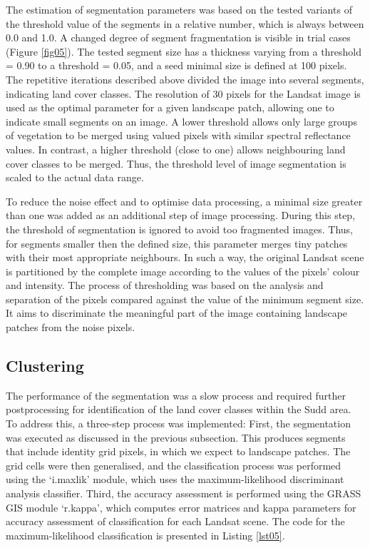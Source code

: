 \documentclass[analytics,article,accept,pdftex,moreauthors]{Definitions/mdpi}
\begin{document}
The estimation of segmentation parameters was based on the tested variants of the threshold value of the segments in a relative number, which is always between 0.0 and 1.0. A changed degree of segment fragmentation is visible in trial cases (Figure \ref{fig05}). The tested segment size has a thickness varying from a threshold = 0.90 to a threshold = 0.05, and a seed minimal size is defined at 100 pixels. %
The repetitive iterations described above divided the image into several segments, indicating land cover classes. The resolution of 30 pixels for the Landsat image is used as the optimal parameter for a given landscape patch, allowing one to indicate small segments on an image. A lower threshold allows only large groups of vegetation to be merged using valued pixels with similar spectral reflectance values. In contrast, a higher threshold (close to one) allows neighbouring land cover classes to be merged. Thus, the threshold level of image segmentation is scaled to the actual data range.

To reduce the noise effect and to optimise data processing, a minimal size greater than one was added as an additional step of image processing. During this step, the threshold of segmentation is ignored to avoid too fragmented images. Thus, for segments smaller then the defined size, this parameter merges tiny patches with their most appropriate neighbours. In such a way, the original Landsat scene is partitioned by the complete image according to the values of the pixels' colour and intensity. %
The process of thresholding was based on the analysis and separation of the pixels compared against the value of the minimum segment size. It aims to discriminate the meaningful part of the image containing landscape patches from the noise pixels.

\subsection{Clustering}

The performance of the segmentation was a slow process and required further postprocessing for identification of the land cover classes within the Sudd area. To address this, a three-step process was implemented: First, the segmentation was executed as discussed in the previous subsection. This produces segments that include identity grid pixels, in which we expect to landscape patches. The grid cells were then generalised, and the classification process was performed using the `i.maxlik' module, which uses the maximum-likelihood discriminant analysis classifier. Third, the accuracy assessment is performed using the GRASS GIS module `r.kappa', which computes error matrices and kappa parameters for accuracy assessment of classification for each Landsat scene. The code for the maximum-likelihood classification is presented in Listing \ref{lst05}.
\end{document}
